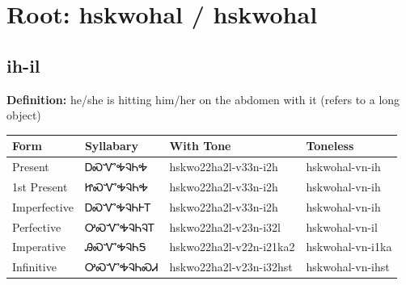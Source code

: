 \documentclass{article}%
\begin{document}
%
\normalsize%
\section*{Root: hskwohal / hskwohal}%
\subsection*{ih-il}%
\textbf{Definition: }%
he/she is hitting him/her on the abdomen with it (refers to a long object)%
\\[0.5em]%
\begin{tabular}{|l|l|l|l|}%
\hline%
\textbf{Form}&\textbf{Syllabary}&\textbf{With Tone}&\textbf{Toneless}\\%
\hline%
Present&ᎠᏍᏉᎭᎸᏂᎭ&hskwo22ha2l{-}v33n{-}i2h&hskwohal{-}vn{-}ih\\%
1st Present&ᏥᏍᏉᎭᎸᏂᎭ&hskwo22ha2l{-}v33n{-}i2h&hskwohal{-}vn{-}ih\\%
Imperfective&ᎠᏍᏉᎭᎸᏂᎰᎢ&hskwo22ha2l{-}v33n{-}i2h&hskwohal{-}vn{-}ih\\%
Perfective&ᎤᏍᏉᎭᎸᏂᎸᎢ&hskwo22ha2l{-}v23n{-}i32l&hskwohal{-}vn{-}il\\%
Imperative&ᎯᏍᏉᎭᎸᏂᎦ&hskwo22ha2l{-}v22n{-}i21ka2&hskwohal{-}vn{-}i1ka\\%
Infinitive&ᎤᏍᏉᎭᎸᏂᏍᏗ&hskwo22ha2l{-}v23n{-}i32hst&hskwohal{-}vn{-}ihst\\%
\hline%
\end{tabular}%
\\[1em]%
\end{document}
